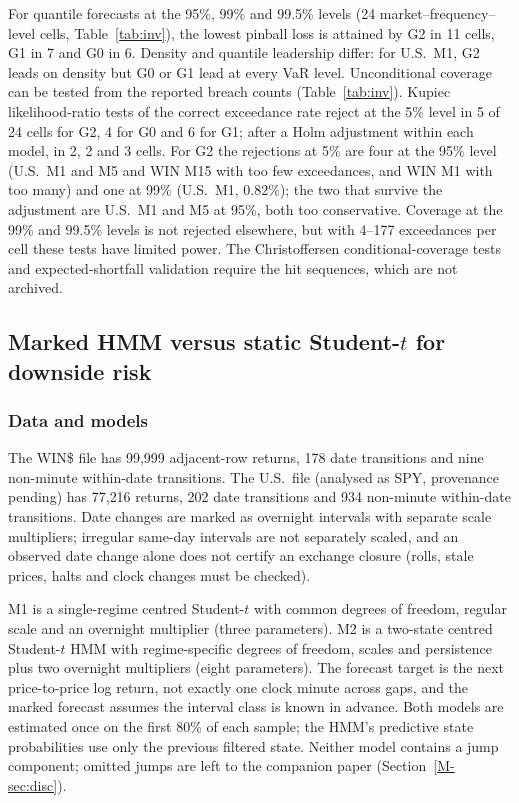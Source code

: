 \documentclass[11pt,a4paper]{article}
\theoremstyle{plain}
\theoremstyle{remark}
\begin{document}
For quantile forecasts at the 95\%, 99\% and 99.5\% levels (24 market--frequency--level cells, Table~\ref{tab:inv}), the lowest pinball loss is attained by G2 in 11 cells, G1 in 7 and G0 in 6. Density and quantile leadership differ: for U.S.\ M1, G2 leads on density but G0 or G1 lead at every VaR level. Unconditional coverage can be tested from the reported breach counts (Table~\ref{tab:inv}). Kupiec \citep{kupiec1995} likelihood-ratio tests of the correct exceedance rate reject at the 5\% level in 5 of 24 cells for G2, 4 for G0 and 6 for G1; after a Holm adjustment within each model, in 2, 2 and 3 cells. For G2 the rejections at 5\% are four at the 95\% level (U.S.\ M1 and M5 and WIN M15 with too few exceedances, and WIN M1 with too many) and one at 99\% (U.S.\ M1, $0.82\%$); the two that survive the adjustment are U.S.\ M1 and M5 at 95\%, both too conservative. Coverage at the 99\% and 99.5\% levels is not rejected elsewhere, but with 4--177 exceedances per cell these tests have limited power. The Christoffersen conditional-coverage tests \citep{christoffersen1998} and expected-shortfall validation require the hit sequences, which are not archived.

\subsection{Marked HMM versus static Student-$t$ for downside risk}\label{sec:var}

\subsubsection{Data and models}
The WIN\$ file has 99{,}999 adjacent-row returns, 178 date transitions and nine non-minute within-date transitions. The U.S.\ file (analysed as SPY, provenance pending) has 77{,}216 returns, 202 date transitions and 934 non-minute within-date transitions. Date changes are marked as overnight intervals with separate scale multipliers; irregular same-day intervals are not separately scaled, and an observed date change alone does not certify an exchange closure (rolls, stale prices, halts and clock changes must be checked). 

M1 is a single-regime centred Student-$t$ with common degrees of freedom, regular scale and an overnight multiplier (three parameters). M2 is a two-state centred Student-$t$ HMM with regime-specific degrees of freedom, scales and persistence plus two overnight multipliers (eight parameters). The forecast target is the next price-to-price log return, not exactly one clock minute across gaps, and the marked forecast assumes the interval class is known in advance. Both models are estimated once on the first 80\% of each sample; the HMM's predictive state probabilities use only the previous filtered state. Neither model contains a jump component; omitted jumps are left to the companion paper (Section~\ref{M-sec:disc}).
\end{document}
